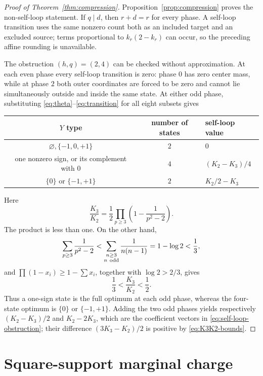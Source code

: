 \documentclass[11pt]{article}
\theoremstyle{definition}
\theoremstyle{remark}
\newcommand{\T}{\{-1,0,+1\}}
\begin{document}
\begin{proof}[Proof of Theorem~\ref{thm:compression}]
Proposition~\ref{prop:compression} proves the non-self-loop statement.
If \(q\mid d\), then \(r+d=r\) for every phase.  A self-loop transition
uses the same nonzero count both as an included target and an excluded
source; terms proportional to \(k_r(2-k_r)\) can occur, so the preceding
affine rounding is unavailable.

The obstruction \((h,q)=(2,4)\) can be checked without approximation.
At each even phase every self-loop transition is zero: phase \(0\) has
zero center mass, while at phase \(2\) both outer coordinates are forced
to be zero and cannot lie simultaneously outside and inside the same
state.  At either odd phase, substituting
\eqref{eq:theta}--\eqref{eq:transition} for all eight subsets gives
\begin{center}
\begin{tabular}{ccl}
\toprule
\(Y\) type & number of states & self-loop value\\
\midrule
\(\varnothing,\T\) & \(2\) & \(0\)\\
one nonzero sign, or its complement with \(0\) & \(4\)
  & \((K_2-K_3)/4\)\\
\(\{0\}\) or \(\{-1,+1\}\) & \(2\)
  & \(K_2/2-K_3\)\\
\bottomrule
\end{tabular}
\end{center}
Here
\[
 \frac{K_3}{K_2}
 =\frac12\prod_{p\geq3}\left(1-\frac1{p^2-2}\right).
\]
The product is less than one.  On the other hand,
\[
 \sum_{p\geq3}\frac1{p^2-2}
 <\sum_{\substack{n\geq3\\n\ {\rm odd}}}\frac1{n(n-1)}
 =1-\log2<\frac13,
\]
and \(\prod(1-x_i)\geq1-\sum x_i\), together with
\(\log2>2/3\), gives
\begin{equation}
 \frac13<\frac{K_3}{K_2}<\frac12.
 \label{eq:K3K2-bounds}
\end{equation}
Thus a one-sign state is the full optimum at each odd phase, whereas
the four-state optimum is \(\{0\}\) or \(\{-1,+1\}\).  Adding the two
odd phases yields respectively
\((K_2-K_3)/2\) and \(K_2-2K_3\), which are the coefficient vectors in
\eqref{eq:self-loop-obstruction}; their difference
\((3K_3-K_2)/2\) is positive by \eqref{eq:K3K2-bounds}.
\end{proof}

\section{Square-support marginal charge}
\end{document}
